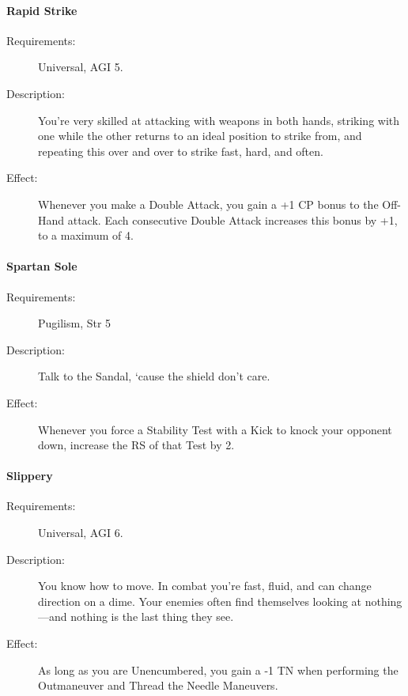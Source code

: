 \documentclass[oneside,11pt,english]{book}
\begin{document}
\paragraph{\label{talent:Rapid Strike}Rapid Strike}
	\begin{description}
		\item [Requirements:] Universal, AGI 5. 
		\item [Description:] You're very skilled at attacking with weapons in both hands, striking with one while the other returns to an ideal position to strike from, and repeating this over and over to strike fast, hard, and often.
		\item [Effect:] Whenever you make a Double Attack, you gain a +1 CP bonus to the Off-Hand attack. Each consecutive Double Attack increases this bonus by +1, to a maximum of 4. 

	\end{description}
\paragraph{\label{talent:Spartan Sole}Spartan Sole}
	\begin{description}
		\item [Requirements:] Pugilism, Str 5 
		\item [Description:] Talk to the Sandal, ‘cause the shield don’t care. 
		\item [Effect:] Whenever you force a Stability Test with a Kick to knock your opponent down, increase the RS of that Test by 2. 

	\end{description}
\paragraph{\label{talent:Slippery}Slippery}
	\begin{description}
		\item [Requirements:] Universal, AGI 6. 
		\item [Description:] You know how to move. In combat you're fast, fluid, and can change direction on a dime. 
Your enemies often find themselves looking at nothing—and nothing is the last thing they see. 
		\item [Effect:] As long as you are Unencumbered, you gain a -1 TN when performing the Outmaneuver and Thread the Needle Maneuvers.

	\end{description}
\end{document}
